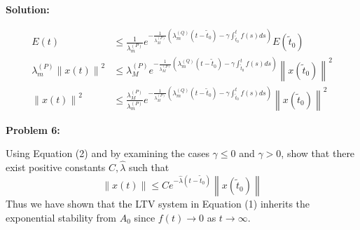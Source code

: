\documentclass[12pt]{article}
\newcommand{\norm}[1]{\left\lVert #1 \right\rVert}
\newenvironment{problem}[1]{
    \textbf{Problem #1:}
}{
    \rmfamily \vspace{1em}
}
\newenvironment{solution}{
    \textbf{Solution:}
    
}{
    
    \vspace{2em}
}
\begin{document}
\begin{solution}
\[
    \begin{aligned}
        E(t) &\leq \frac{1}{\lambda^{(P)}_m} e^{-\frac{1}{\lambda^{(P)}_M}\left(\lambda^{(Q)}_m(t-\tilde{t}_0) - \gamma\int_{\tilde{t}_0}^t f(s)ds\right)} E(\tilde{t}_0) \\
        \lambda^{(P)}_m \norm{x(t)}^2 &\leq \lambda^{(P)}_M e^{-\frac{1}{\lambda^{(P)}_M}\left(\lambda^{(Q)}_m(t-\tilde{t}_0) - \gamma\int_{\tilde{t}_0}^t f(s)ds\right)}\norm{x(\tilde{t}_0)}^2\\
        \norm{x(t)}^2 &\leq \frac{\lambda^{(P)}_M}{\lambda^{(P)}_m} e^{-\frac{1}{\lambda^{(P)}_M}\left(\lambda^{(Q)}_m(t-\tilde{t}_0) - \gamma\int_{\tilde{t}_0}^t f(s)ds\right)} \norm{x(\tilde{t}_0)}^2
    \end{aligned}
\]
\end{solution}

\newpage

\begin{problem}{6}
Using Equation (2) and by examining the cases \(\gamma \leq 0\) and \(\gamma > 0\), show that there exist positive constants \(C, \hat{\lambda}\) such that
\[
    \norm{x(t)} \leq C e^{-\hat{\lambda}(t-\tilde{t}_0)} \norm{x(\tilde{t}_0)}
\]
Thus we have shown that the LTV system in Equation (1) inherits the exponential stability from \(A_0\) since \(f(t) \to 0\) as \(t \to \infty\).
\end{problem}
\end{document}

